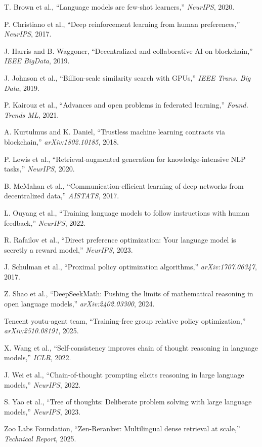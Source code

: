 \documentclass[11pt,letterpaper]{article}
\begin{document}

\begin{thebibliography}{99}

T. Brown et al., ``Language models are few-shot learners,'' \textit{NeurIPS}, 2020.

P. Christiano et al., ``Deep reinforcement learning from human preferences,'' \textit{NeurIPS}, 2017.

J. Harris and B. Waggoner, ``Decentralized and collaborative AI on blockchain,'' \textit{IEEE BigData}, 2019.

J. Johnson et al., ``Billion-scale similarity search with GPUs,'' \textit{IEEE Trans. Big Data}, 2019.

P. Kairouz et al., ``Advances and open problems in federated learning,'' \textit{Found. Trends ML}, 2021.

A. Kurtulmus and K. Daniel, ``Trustless machine learning contracts via blockchain,'' \textit{arXiv:1802.10185}, 2018.

P. Lewis et al., ``Retrieval-augmented generation for knowledge-intensive NLP tasks,'' \textit{NeurIPS}, 2020.

B. McMahan et al., ``Communication-efficient learning of deep networks from decentralized data,'' \textit{AISTATS}, 2017.

L. Ouyang et al., ``Training language models to follow instructions with human feedback,'' \textit{NeurIPS}, 2022.

R. Rafailov et al., ``Direct preference optimization: Your language model is secretly a reward model,'' \textit{NeurIPS}, 2023.

J. Schulman et al., ``Proximal policy optimization algorithms,'' \textit{arXiv:1707.06347}, 2017.

Z. Shao et al., ``DeepSeekMath: Pushing the limits of mathematical reasoning in open language models,'' \textit{arXiv:2402.03300}, 2024.

Tencent youtu-agent team, ``Training-free group relative policy optimization,'' \textit{arXiv:2510.08191}, 2025.

X. Wang et al., ``Self-consistency improves chain of thought reasoning in language models,'' \textit{ICLR}, 2022.

J. Wei et al., ``Chain-of-thought prompting elicits reasoning in large language models,'' \textit{NeurIPS}, 2022.

S. Yao et al., ``Tree of thoughts: Deliberate problem solving with large language models,'' \textit{NeurIPS}, 2023.

Zoo Labs Foundation, ``Zen-Reranker: Multilingual dense retrieval at scale,'' \textit{Technical Report}, 2025.

\end{thebibliography}
\end{document}
